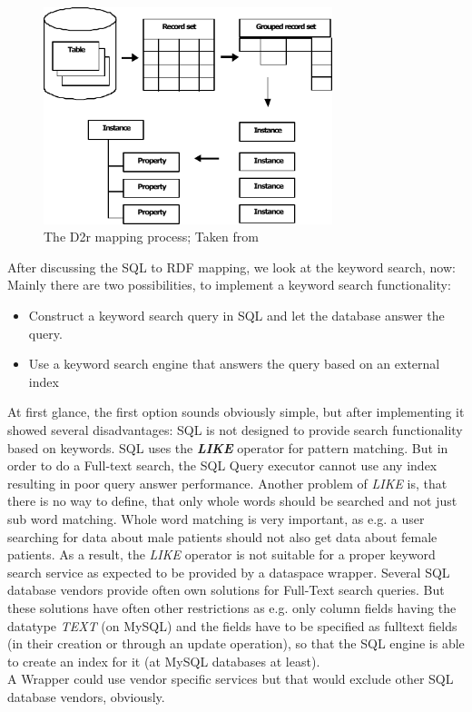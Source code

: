 \begin{figure}[H]
	\begin{center}
		\includegraphics[width=0.75\textwidth]{figures/MappingProcess.pdf}
	\end{center}
	\caption{The D2r mapping process; Taken from \cite{D2rMap_aDatabaseToRdfMappingLanguage}}
	\label{D2rMappingProcessFigure}
\end{figure}

After discussing the SQL to RDF mapping, we look at the keyword search, now:
Mainly there are two possibilities, to implement a keyword search functionality:
\begin{itemize}
	\item {Construct a keyword search query in SQL and let the database answer the query.}
	
	\item {Use a keyword search engine that answers the query based on an external index}
\end{itemize}

At first glance, the first option sounds obviously simple, but after implementing it showed several disadvantages: SQL is not designed to provide search functionality based on keywords. SQL uses the \textbf{\emph{LIKE}} operator for pattern matching. But in order to do a Full-text search, the SQL Query executor cannot use any index resulting in poor query answer performance. Another problem of \emph{LIKE} is, that there is no way to define, that only whole words should be searched and not just sub word matching. Whole word matching is very important, as e.g. a user searching for data about male patients should not also get data about female patients.
As a result, the \emph{LIKE} operator is not suitable for a proper keyword search service as expected to be provided by a dataspace wrapper. Several SQL database vendors provide often own solutions for Full-Text search queries. But these solutions have often other restrictions as e.g. only column fields having the datatype \emph{TEXT} (on MySQL) and the fields have to be specified as fulltext fields (in their creation or through an update operation), so that the SQL engine is able to create an index for it (at MySQL databases at least).\\
A Wrapper could use vendor specific services but that would exclude other SQL database vendors, obviously.

